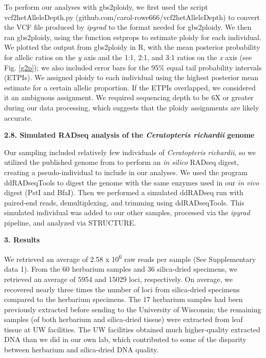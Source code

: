 \documentclass[12pt]{article}
\begin{document}
\begin{flushleft}
To perform our analyses with gbs2ploidy, we first used the script vcf2hetAlleleDepth.py (github.com/carol-rowe666/vcf2hetAlleleDepth) to convert the VCF file produced by \textit{ipyrad} to the format needed for gbs2ploidy. We then ran gbs2ploidy, using the function estprops to estimate ploidy for each individual. We plotted the output from gbs2ploidy in R, with the mean posterior probability for allelic ratios on the \textit{y} axis and the 1:1, 2:1, and 3:1 ratios on the \textit{x} axis (see Fig. \ref{g2p}); we also included error bars for the 95\% equal tail probability intervals (ETPIs). We assigned ploidy to each individual using the  highest posterior mean estimate for a certain allelic proportion. If the ETPIs overlapped, we considered it an ambiguous assignment. We required sequencing depth to be 6X or greater during our data processing, which suggests that the ploidy assignments are likely accurate.

\textbf{2.8. Simulated RADseq analysis of the \textit{Ceratopteris richardii} genome}

Our sampling included relatively few individuals of \textit{Ceratopteris richardii}, so we utilized the published genome from \textcite{Marchant2019} to perform an \textit{in silico} RADseq digest, creating a pseudo-individual to include in our analyses. We used the program ddRADseqTools \autocite{Mora-Marquez2017} to digest the genome with the same enzymes used in our \textit{in vivo} digest (PstI and BfaI). Then we performed a simulated ddRADseq run with paired-end reads, demultiplexing, and trimming using ddRADseqTools. This simulated individual was added to our other samples, processed via the \textit{ipyrad} pipeline, and analyzed via STRUCTURE. 

\vspace{1cm}

{\large\textbf{3. Results}}

We retrieved an average of 2.58 x 10\textsuperscript{6} raw reads per sample (See Supplementary data 1). From the 60 herbarium samples and 36 silica-dried specimens, we retrieved an average of 5954 and 15029 loci, respectively. On average, we recovered nearly three times the number of loci from silica-dried specimens compared to the herbarium specimens. The 17 herbarium samples had been previously extracted before sending to the University of Wisconsin; the remaining samples (of both herbarium and silica-dried tissue) were extracted from leaf tissue at UW facilities. The UW facilities obtained much higher-quality extracted DNA than we did in our own lab, which contributed to some of the disparity between herbarium and silica-dried DNA quality.


\end{flushleft}
\end{document}
